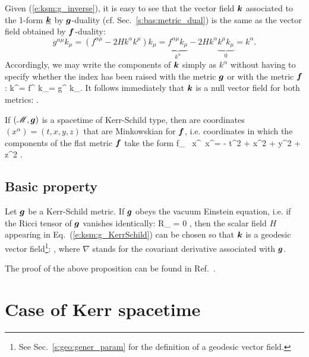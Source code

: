 Given (\ref{e:ksm:g_inverse}), it is easy to see that the vector field
$\bm{k}$ associated
to the 1-form $\underline{\bm{k}}$ by $\bm{g}$-duality (cf. Sec.~\ref{s:bas:metric_dual})
is the same as the vector field
obtained by $\bm{f}$-duality:
\[
    g^{\alpha\mu} k_\mu = (f^{\alpha\mu} - 2 H k^\alpha k^\mu) k_\mu
                        = \underbrace{f^{\alpha\mu} k_\mu}_{k^\alpha}
                          - 2H k^\alpha \underbrace{k^\mu k_\mu}_{0}
                        = k^\alpha .
\]
Accordingly, we may write the components of $\bm{k}$ simply as $k^\alpha$
without having to specify whether the index has been raised with the
metric $\bm{g}$ or with the metric $\bm{f}$:
\be
    k^\alpha = f^{\alpha\mu} k_\mu  = g^{\alpha\mu} k_\mu .
\ee
It follows immediately that $\bm{k}$ is a null vector field for
both metrics:
\be
   .
\ee


If $(\mathscr{M},\bm{g})$ is a spacetime of Kerr-Schild type, then 
are coordinates $(x^\alpha) = (t,x,y,z)$ that are Minkowskian
for $\bm{f}$, i.e. coordinates in which the components of the flat metric
$\bm{f}$ take the form
\be \label{e:ksm:ds_eta}
    f_{\mu\nu} \, \D x^\mu \, \D x^\nu = - \D t^2 + \D x^2 + \D y^2
        + \D z^2 .
\ee

\subsection{Basic property}

\begin{greybox}
Let $\bm{g}$ be a Kerr-Schild metric.
If $\bm{g}$ obeys the vacuum Einstein
equation, i.e. if the Ricci tensor of $\bm{g}$ vanishes identically:
\be
    R_{\alpha\beta} = 0 ,
\ee
then the scalar field $H$ appearing in Eq.~(\ref{e:ksm:g_KerrSchild})
can be chosen so that $\bm{k}$ is a geodesic vector field\footnote{See Sec.~\ref{s:geo:gener_param} for the definition of a geodesic vector field.}:
\be \label{e:ksm:k_geodesic}
    ,
\ee
where $\nabla$ stands for the covariant derivative associated with $\bm{g}$.
\end{greybox}

The proof of the above proposition can be found in Ref.~\cite{KerrS65}.



\section{Case of Kerr spacetime}

